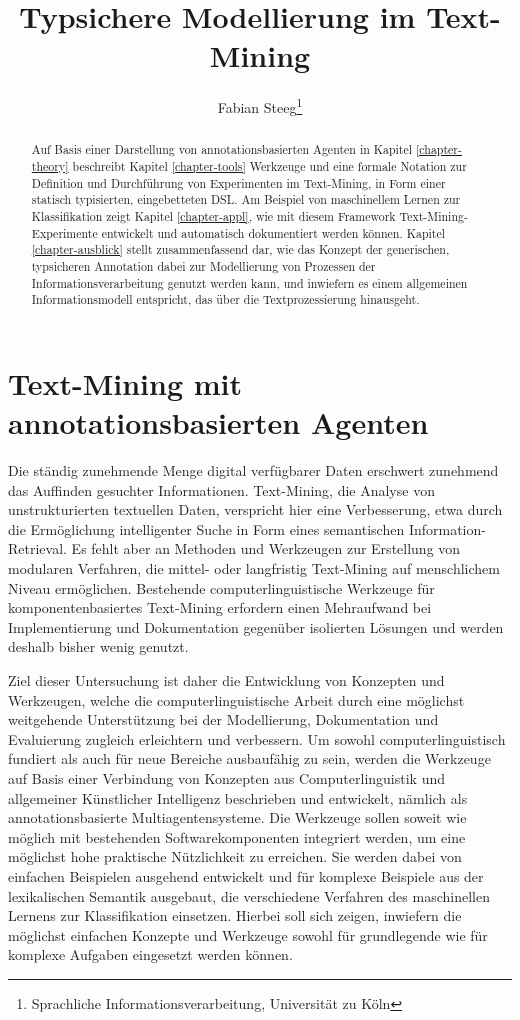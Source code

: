 \documentclass[abstracton, 12pt]{scrartcl}
\title{Typsichere Modellierung im Text-Mining}
\author{Fabian Steeg\footnote{Sprachliche Informationsverarbeitung, Universität zu Köln}}
\begin{document}
\maketitle
\thispagestyle{empty}

\begin{abstract}
Auf Basis einer Darstellung von annotationsbasierten Agenten in Kapitel \ref{chapter-theory} beschreibt Kapitel \ref{chapter-tools} Werkzeuge und eine formale Notation zur Definition und Durchführung von Experimenten im Text-Mining, in Form einer statisch typisierten, eingebetteten DSL. Am Beispiel von maschinellem Lernen zur Klassifikation zeigt Kapitel \ref{chapter-appl}, wie mit diesem Framework Text-Mining-Experimente entwickelt und automatisch dokumentiert werden können. Kapitel \ref{chapter-ausblick} stellt zusammenfassend dar, wie das Konzept der generischen, typsicheren Annotation dabei zur Modellierung von Prozessen der Informationsverarbeitung genutzt werden kann, und inwiefern es einem allgemeinen Informationsmodell entspricht, das über die Textprozessierung hinausgeht.
\end{abstract}

\setcounter{tocdepth}{1}
\tableofcontents
\newpage
{}
\section{Text-Mining mit annotationsbasierten Agenten} \label{chapter-theory}

Die ständig zunehmende Menge digital verfügbarer Daten erschwert zunehmend das Auffinden gesuchter Informationen. Text-Mining, die Analyse von unstrukturierten textuellen Daten, verspricht hier eine Verbesserung, etwa durch die Ermöglichung intelligenter Suche in Form eines semantischen Information-Re\-triev\-al. Es fehlt aber an Methoden und Werkzeugen zur Erstellung von modularen Verfahren, die mittel- oder langfristig Text-Mining auf menschlichem Niveau ermöglichen. Bestehende computerlinguistische Werkzeuge für komponentenbasiertes Text-Mining erfordern einen Mehraufwand bei Implementierung und Dokumentation gegenüber isolierten Lösungen und werden deshalb bisher wenig genutzt.

Ziel dieser Untersuchung ist daher die Entwicklung von Konzepten und Werkzeugen, welche die computerlinguistische Arbeit durch eine möglichst weitgehende Unterstützung bei der Modellierung, Dokumentation und Evaluierung zugleich erleichtern und verbessern. Um sowohl computerlinguistisch fundiert als auch für neue Bereiche ausbaufähig zu sein, werden die Werkzeuge auf Basis einer Verbindung von Konzepten aus Computerlinguistik und allgemeiner Künstlicher Intelligenz beschrieben und entwickelt, nämlich als annotationsbasierte Multiagentensysteme. Die Werkzeuge sollen soweit wie möglich mit bestehenden Softwarekomponenten integriert werden, um eine möglichst hohe praktische Nützlichkeit zu erreichen. Sie werden dabei von einfachen Beispielen ausgehend entwickelt und für komplexe Beispiele aus der lexikalischen Semantik ausgebaut, die verschiedene Verfahren des maschinellen Lernens zur Klassifikation einsetzen. Hierbei soll sich zeigen, inwiefern die möglichst einfachen Konzepte und Werkzeuge sowohl für grundlegende wie für komplexe Aufgaben eingesetzt werden können.
\end{document}

